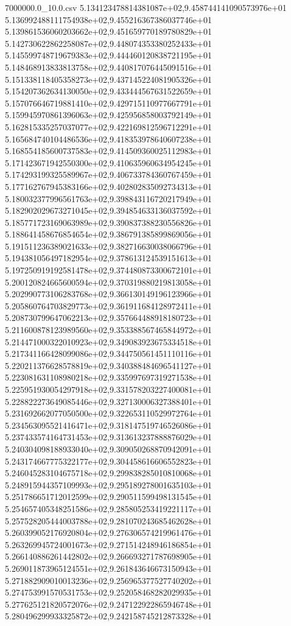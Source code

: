 \begin{filecontents*}{7000000.0_10.0.csv}
5.134123478814381087e+02,9.458744141090573976e+01
5.136992488111754938e+02,9.455216367386037746e+01
5.139861536060203662e+02,9.451659770189780829e+01
5.142730622862258087e+02,9.448074353380252433e+01
5.145599748719679383e+02,9.444460120838721195e+01
5.148468913833813758e+02,9.440817076445091516e+01
5.151338118405358273e+02,9.437145224081905326e+01
5.154207362634130050e+02,9.433444567631522659e+01
5.157076646719881410e+02,9.429715110977667791e+01
5.159945970861396063e+02,9.425956858003792149e+01
5.162815335257037077e+02,9.422169812596712291e+01
5.165684740104486536e+02,9.418353978640607238e+01
5.168554185600737583e+02,9.414509360025112983e+01
5.171423671942550300e+02,9.410635960634954245e+01
5.174293199325589967e+02,9.406733784360767459e+01
5.177162767945383166e+02,9.402802835092734313e+01
5.180032377996561763e+02,9.398843116720217949e+01
5.182902029673271045e+02,9.394854633136037592e+01
5.185771723169063989e+02,9.390837388230556826e+01
5.188641458676854654e+02,9.386791385899869056e+01
5.191511236389021633e+02,9.382716630038066796e+01
5.194381056497182954e+02,9.378613124539151613e+01
5.197250919192581478e+02,9.374480873300672101e+01
5.200120824665600594e+02,9.370319880219813058e+01
5.202990773106283768e+02,9.366130149196123966e+01
5.205860764703829773e+02,9.361911684128972411e+01
5.208730799647062213e+02,9.357664488918180723e+01
5.211600878123989560e+02,9.353388567465844972e+01
5.214471000322010923e+02,9.349083923675334518e+01
5.217341166428099086e+02,9.344750561451110116e+01
5.220211376628578819e+02,9.340388484696541127e+01
5.223081631108980218e+02,9.335997697319271538e+01
5.225951930054297918e+02,9.331578203227400081e+01
5.228822273649085446e+02,9.327130006327388401e+01
5.231692662077050500e+02,9.322653110529972764e+01
5.234563095521416471e+02,9.318147519746526086e+01
5.237433574164731453e+02,9.313613237888876029e+01
5.240304098188933040e+02,9.309050268870942091e+01
5.243174667775322177e+02,9.304458616606552823e+01
5.246045283104675718e+02,9.299838285010810068e+01
5.248915944357109993e+02,9.295189278001635103e+01
5.251786651712012599e+02,9.290511599498131545e+01
5.254657405348251586e+02,9.285805253419221117e+01
5.257528205444003788e+02,9.281070243685462628e+01
5.260399052176920804e+02,9.276306574219961476e+01
5.263269945724001673e+02,9.271514248946186854e+01
5.266140886261442802e+02,9.266693271787698905e+01
5.269011873965124551e+02,9.261843646673150943e+01
5.271882909010013236e+02,9.256965377527740202e+01
5.274753991570531753e+02,9.252058468282029935e+01
5.277625121820572076e+02,9.247122922865946748e+01
5.280496299933325872e+02,9.242158745212873328e+01

\end{filecontents*}
